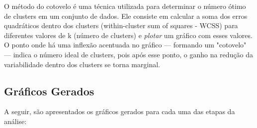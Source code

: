 \documentclass[manuscript,screen,review]{acmart}
\begin{document}
O método do cotovelo é uma técnica utilizada para determinar o número ótimo de clusters em um conjunto de dados. Ele consiste em calcular a soma dos erros quadráticos dentro dos clusters (within-cluster sum of squares - WCSS) para diferentes valores de k (número de clusters) e \textit{plotar} um gráfico com esses valores. O ponto onde há uma inflexão acentuada no gráfico — formando um "cotovelo" — indica o número ideal de clusters, pois após esse ponto, o ganho na redução da variabilidade dentro dos clusters se torna marginal.

\subsection{Gráficos Gerados}

A seguir, são apresentados os gráficos gerados para cada uma das etapas da análise:
\end{document}
